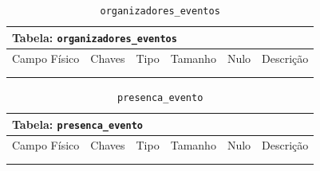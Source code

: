 \documentclass[12pt,a4paper]{article}
\begin{document}
\begin{center}
\begin{table}[h!]
	\caption{\texttt{organizadores\_eventos}}
	\label{tabela:organizadoresEventos}
	\begin{tabular}{|p{2.5cm}|p{1cm}|p{1.25cm}|p{1.75cm}|p{1.25cm}|p{5cm}|}\hline	
		\multicolumn{6}{|p{16cm}|}{\cellcolor{cinzaClaro}  \centering Tabela: \texttt{organizadores\_eventos}} \\ \hline %
		{\small Campo Físico}   & {\small Chaves} & {\small Tipo} & {\small Tamanho} & {\small Nulo} & {\small Descrição}\\\hline %
		
		{\tiny } & {\tiny } & {\tiny } & {\tiny } & {\tiny } &{\tiny }\\\hline
		{\tiny } & {\tiny } & {\tiny } & {\tiny } & {\tiny } &{\tiny }\\\hline
			
	\end{tabular}
\end{table}	
\end{center}


\begin{center}
\begin{table}[h!]
	\caption{\texttt{presenca\_evento}}
	\label{tabela:presencaEvento}
	\begin{tabular}{|p{2.5cm}|p{1cm}|p{1.25cm}|p{1.75cm}|p{1.25cm}|p{5cm}|}\hline	
		\multicolumn{6}{|p{16cm}|}{\cellcolor{cinzaClaro}  \centering Tabela: \texttt{presenca\_evento}} \\ \hline %
		{\small Campo Físico}   & {\small Chaves} & {\small Tipo} & {\small Tamanho} & {\small Nulo} & {\small Descrição}\\\hline %
		
		{\tiny }  & {\tiny } & {\tiny } & {\tiny } & {\tiny } &{\tiny }\\\hline
		{\tiny }  & {\tiny } & {\tiny } & {\tiny } & {\tiny } &{\tiny }\\\hline
			
	\end{tabular}
\end{table}	
\end{center}
\end{document}
